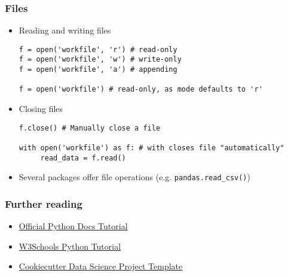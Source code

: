 \begin{frame}[fragile]
    \frametitle{Files}
    \begin{itemize}
        \item Reading and writing files
\begin{verbatim}
f = open('workfile', 'r') # read-only
f = open('workfile', 'w') # write-only
f = open('workfile', 'a') # appending

f = open('workfile') # read-only, as mode defaults to 'r'
\end{verbatim}
        \item Closing files
\begin{verbatim}
f.close() # Manually close a file

with open('workfile') as f: # with closes file "automatically"
     read_data = f.read()
\end{verbatim}
        \item Several packages offer file operations (e.g.
        \texttt{pandas.read_csv()})
    \end{itemize}
\end{frame}

\begin{frame}
    \frametitle{Further reading}
    \begin{itemize}
        \item \href{https://docs.python.org/3/tutorial/index.html}{Official Python Docs Tutorial}
        \item \href{https://www.w3schools.com/python/}{W3Schools Python Tutorial}
        \item \href{http://drivendata.github.io/cookiecutter-data-science/}{Cookiecutter Data Science Project Template}
    \end{itemize}
\end{frame}
